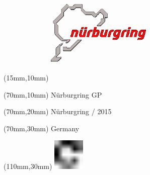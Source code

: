 \null\newpage
\begin{textblock*}{50mm}(15mm,10mm)%
\includegraphics[width=50mm]{LG/NUR.png}
\end{textblock*}
\begin{textblock*}{130mm}(70mm,10mm)%
{\fontsize{20}{20}\selectfont Nürburgring GP}\\
\end{textblock*}
\begin{textblock*}{120mm}(70mm,20mm)%
{\fontsize{16}{16}\selectfont Nürburgring / 2015}\\
\end{textblock*}
\begin{textblock*}{120mm}(70mm,30mm)%
{\fontsize{12}{12}\selectfont Germany}
\end{textblock*}
\begin{textblock*}{30mm}(110mm,30mm)%
\centering
\includegraphics[height=15mm]{icons/fa-rotate-right.pdf}
\end{textblock*}
